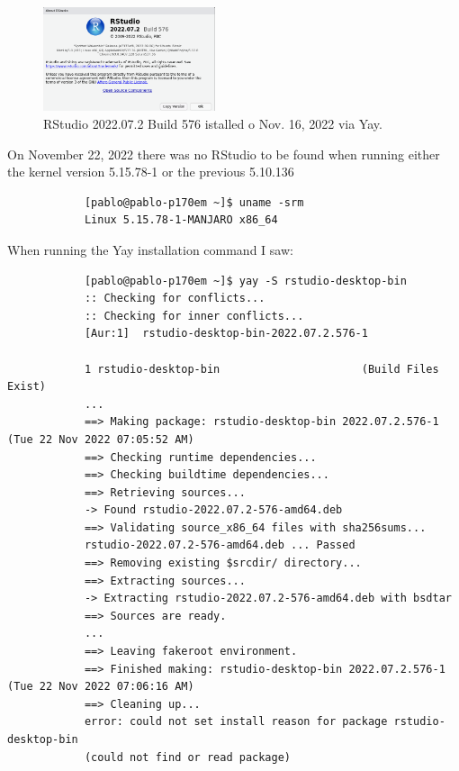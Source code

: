 \documentclass[]{scrartcl}
\begin{document}
	\begin{figure}[!htb]
	\centering
	\caption{RStudio 2022.07.2 Build 576 istalled o Nov. 16, 2022 via Yay.}
	\includegraphics[width=0.45\textwidth]{Images/RStudioSplashWindowNov-16-2022.png}
	\end{figure}
	
	
	On November 22, 2022 there was no RStudio to be found when running either the kernel
	version 5.15.78-1 or the previous 5.10.136
	
	\begin{small}
		\begin{verbatim}
			[pablo@pablo-p170em ~]$ uname -srm
			Linux 5.15.78-1-MANJARO x86_64
		\end{verbatim}
	\end{small}
	
	When running the Yay installation command I saw:
	
	\begin{small}
		\begin{verbatim}
			[pablo@pablo-p170em ~]$ yay -S rstudio-desktop-bin
			:: Checking for conflicts...
			:: Checking for inner conflicts...
			[Aur:1]  rstudio-desktop-bin-2022.07.2.576-1
			
			1 rstudio-desktop-bin                      (Build Files Exist)
			...
			==> Making package: rstudio-desktop-bin 2022.07.2.576-1 (Tue 22 Nov 2022 07:05:52 AM)
			==> Checking runtime dependencies...
			==> Checking buildtime dependencies...
			==> Retrieving sources...
			-> Found rstudio-2022.07.2-576-amd64.deb
			==> Validating source_x86_64 files with sha256sums...
			rstudio-2022.07.2-576-amd64.deb ... Passed
			==> Removing existing $srcdir/ directory...
			==> Extracting sources...
			-> Extracting rstudio-2022.07.2-576-amd64.deb with bsdtar
			==> Sources are ready.
			...
			==> Leaving fakeroot environment.
			==> Finished making: rstudio-desktop-bin 2022.07.2.576-1 (Tue 22 Nov 2022 07:06:16 AM)
			==> Cleaning up...
			error: could not set install reason for package rstudio-desktop-bin 
			(could not find or read package)
		\end{verbatim}
	\end{small}
	
\end{document}
